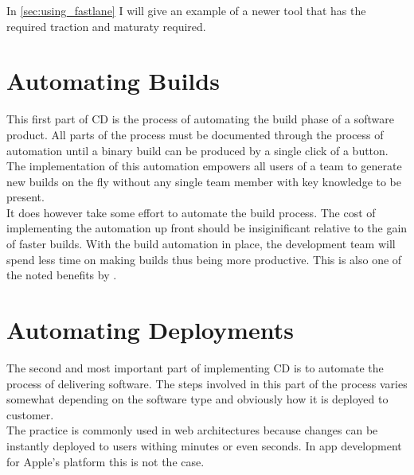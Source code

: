 \documentclass{ituthesis}
\begin{document}
In \autoref{sec:using_fastlane} I will give an example of a newer tool that has the required traction and maturaty required.


\section{Automating Builds}

This first part of CD is the process of automating the build phase of a software product. All parts of the process must be documented through the process of automation \cite{Osterweil1997} until a binary build can be produced by a single click of a button. The implementation of this automation empowers all users of a team to generate new builds on the fly without any single team member with key knowledge to be present.\\

It does however take some effort to automate the build process. The cost of implementing the automation up front should be insiginificant relative to the gain of faster builds. With the build automation in place, the development team will spend less time on making builds thus being more productive. This is also one of the noted benefits by \cite{Chen2015}.

\section{Automating Deployments}

The second and most important part of implementing CD is to automate the process of delivering software. The steps involved in this part of the process varies somewhat depending on the software type and obviously how it is deployed to customer.\\

The practice is commonly used in web architectures because changes can be instantly deployed to users withing minutes or even seconds. In app development for Apple's platform this is not the case. %

\end{document}
